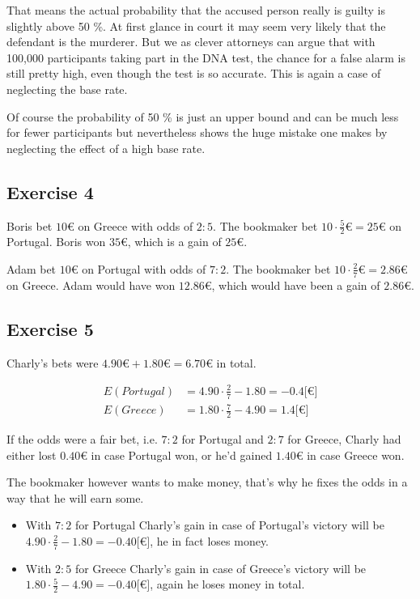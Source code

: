 \documentclass[../main/Notes.tex]{subfiles}
\begin{document}
That means the actual probability that the accused person really is guilty is slightly above 50 \%. At first glance in court it may seem very likely that the defendant is the murderer. But we as clever attorneys can argue that with 100,000 participants taking part in the DNA test, the chance for a false alarm is still pretty high, even though the test is so accurate. This is again a case of neglecting the base rate. 

\bigskip

Of course the probability of 50 \% is just an upper bound and can be much less for fewer participants but nevertheless shows the huge mistake one makes by neglecting the effect of a high base rate.  

\subsection*{Exercise 4}
Boris bet $10\euro$ on Greece with odds of $2 : 5$. The bookmaker bet $10\cdot\frac{5}{2}\euro=25\euro$ on Portugal. Boris won $35\euro$, which is a gain of $25\euro$.

Adam bet $10\euro$ on Portugal with odds of $7 : 2$. The bookmaker bet $10\cdot\frac{2}{7}\euro=2.86\euro$ on Greece. Adam would have won $12.86\euro$, which would have been a gain of $2.86\euro$.

\subsection*{Exercise 5}
Charly's bets were $4.90\euro+1.80\euro=6.70\euro$ in total.

\begin{align*}
E(Portugal) &= 4.90 \cdot \frac{2}{7} - 1.80 = -0.4 {[}\euro{]} \\
E(Greece)   &= 1.80 \cdot \frac{7}{2} - 4.90 =  1.4 {[}\euro{]}
\end{align*}

If the odds were a fair bet, i.e. $7 : 2$ for Portugal and $2 : 7$ for Greece, Charly had either lost $0.40\euro$ in case Portugal won, or he'd gained $1.40\euro$ in case Greece won.

\bigskip

The bookmaker however wants to make money, that's why he fixes the odds in a way that he will earn some.

\begin{itemize}
	\item[] With $7 : 2$ for Portugal Charly's gain in case of Portugal's victory will be $4.90 \cdot \frac{2}{7} - 1.80 = -0.40 {[}\euro{]}$, he in fact loses money.
  \item[] With $2 : 5$ for Greece Charly's gain in case of Greece's victory will be $1.80 \cdot \frac{5}{2} - 4.90 = -0.40 {[}\euro{]}$, again he loses money in total.
\end{itemize}
\end{document}

